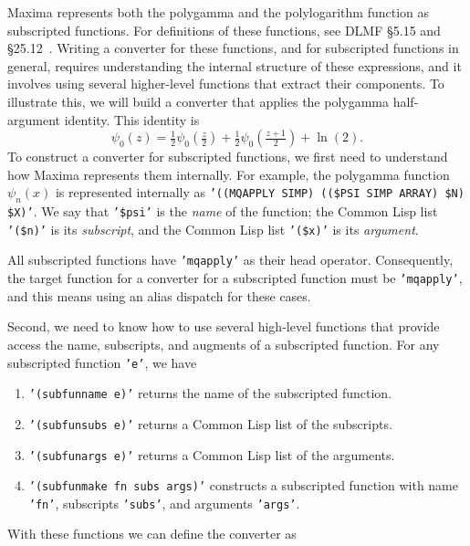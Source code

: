\documentclass[12pt,fleqn]{extarticle}
\newcommand{\ttq}[1]{\texttt{'#1'}}
\begin{document}
Maxima represents both the polygamma and the polylogarithm function as subscripted functions. For definitions of these functions, see DLMF  §5.15 and §25.12~\cite{DLMF}. Writing a converter for these functions, and for subscripted functions in general, requires understanding the internal structure of these expressions, and it involves using several higher-level functions that extract their components. To illustrate this, we will build a converter that applies the polygamma half-argument identity. This identity is
 \begin{equation}
 \psi_0\left(z\right)=\tfrac{1}{2} \psi_0\left(\tfrac{z}{2}\right)+
   \tfrac{1}{2} \psi_0\left(\tfrac{z+1}{2}\right)+\ln\left(2\right).
 \end{equation}
 To construct a converter for subscripted functions, we first need to understand how Maxima represents them internally. For example, the polygamma function \(\psi _n(x)\) is represented internally as
\ttq{((MQAPPLY SIMP) ((\$PSI SIMP ARRAY) \$N) \$X)}. We say that \ttq{\$psi} is the \emph{name} of the function; the Common Lisp list \ttq{(\$n)} is its \emph{subscript}, and the Common Lisp list \ttq{(\$x)} is its \emph{argument}.

All subscripted functions have \ttq{mqapply} as their head operator.
Consequently, the target function for a converter for a subscripted function must be \ttq{mqapply},
and this means using an alias dispatch for these cases.

Second, we need to know how to use several high-level functions that provide access the name, subscripts, and augments of a subscripted function. For any subscripted function  \ttq{e}, we have 
 \begin{enumerate}[label=(\alph*), itemsep=3pt, topsep=2pt, parsep=0pt]
  \item  \ttq{(subfunname e)} returns the name of the subscripted function.
    
  \item  \ttq{(subfunsubs e)} returns a Common Lisp list of the subscripts.
  
  \item \ttq{(subfunargs e)} returns a Common Lisp list of the arguments.
  
  \item \ttq{(subfunmake fn subs args)} constructs a subscripted function
  with name \ttq{fn}, subscripts \ttq{subs}, and arguments \ttq{args}.
 \end{enumerate}
 \noindent  With these functions we can define the converter as
 
\end{document}
